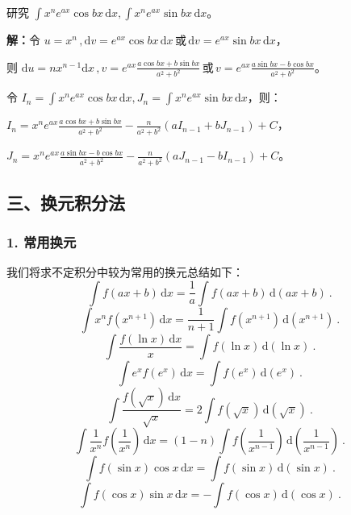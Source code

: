 \begin{corollary}{}
研究 $\displaystyle{\int x^n e^{ax}\cos bx\,\mathrm{d}x,\int x^n e^{ax}\sin bx\,\mathrm {d}x}$。

\textbf{解：}令 $\displaystyle{u=x^n\,,\mathrm{d}v=e^{ax}\cos{bx}\,\mathrm{d}x\,\text{或}\,\mathrm{d}v=e^{ax}\sin{bx}\,\mathrm{d}x}$，

则 $\displaystyle{\mathrm{d}u=nx^{n-1}\mathrm{d}x\,,v=e^{ax}\frac{a\cos bx+b\sin bx}{a^2+b^2}\,\text{或}\,v=e^{ax}\frac{a\sin bx-b\cos bx}{a^2+b^2}}$。

令 $\displaystyle{I_n=\int x^n e^{ax}\cos bx\,\mathrm{d}x},J_n=\int x^n e^{ax}\sin bx\,\mathrm{d}x$，则：

$\displaystyle{I_n=x^n e^{ax}\frac{{a\cos bx+b\sin bx}}{a^2+b^2}-\frac{n}{a^2+b^2}\left(aI_{n-1}+bJ_{n-1}\right)+C}$，

$\displaystyle{J_n=x^n e^{ax}\frac{{a\sin bx-b\cos bx}}{a^2+b^2}-\frac{n}{a^2+b^2}\left(aJ_{n-1}-bI_{n-1}\right)+C}$。
\end{corollary}

\subsection{三、换元积分法}
\subsubsection{1. 常用换元}
我们将求不定积分中较为常用的换元总结如下：
\begin{equation}
\int f(ax+b)\,\mathrm{d}x=\frac{1}{a}\int f(ax+b)\,\mathrm{d}\left(ax+b\right)~.
\end{equation}
\begin{equation}
\int x^nf(x^{n+1})\,\mathrm{d}x=\frac{1}{n+1}\int f(x^{n+1})\,\mathrm{d}(x^{n+1})~.
\end{equation}
\begin{equation}
\int \frac{f(\ln x)\,\mathrm{d}x}{x}=\int f(\ln x)\,\mathrm{d}(\ln x)~.
\end{equation}
\begin{equation}
\int e^xf(e^x)\,\mathrm{d}x=\int f(e^x)\,\mathrm{d}(e^x)~.
\end{equation}
\begin{equation}
\int \frac{f(\sqrt{x})\,\mathrm{d}x}{\sqrt{x}}=2\int f(\sqrt{x})\,\mathrm{d}(\sqrt{x})~.
\end{equation}
\begin{equation}
\int \frac{1}{x^n}f\left(\frac{1}{x^n}\right)\,\mathrm{d}x=(1-n)\int f\left(\frac{1}{x^{n-1}}\right)\,\mathrm{d}\left(\frac{1}{x^{n-1}}\right)~.
\end{equation}
\begin{equation}
\int f(\sin x)\cos x\,\mathrm{d}x=\int f(\sin x)\,\mathrm{d}(\sin x)~.
\end{equation}
\begin{equation}
\int f(\cos x)\sin x\,\mathrm{d}x=-\int f(\cos x)\,\mathrm{d}(\cos x)~.
\end{equation}

